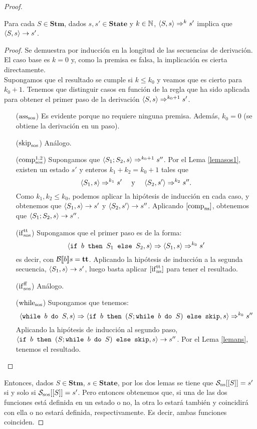 \begin{proof}
\begin{lema}
Para cada $S \in \mathbf{Stm}$, dados $s, s' \in \mathbf{State}$ y $k \in \mathbb{N}$, $\langle S, s \rangle\Rightarrow^k s'$ implica que $\langle S, s \rangle\to s'$.
\end{lema}
\begin{proof}
Se demuestra por inducción en la longitud de las secuencias de derivación. El caso base es $k=0$ y, como la premisa es falsa, la implicación es cierta directamente.
\\

Supongamos que el resultado se cumple si $k \leq k_0$ y veamos que es cierto para $k_0 +1$. Tenemos que distinguir casos en función de la regla que ha sido aplicada para obtener el primer paso de la derivación $\langle S, s \rangle\Rightarrow^{k_0+1}s'$.
\begin{itemize}
    \item[($\mathrm{ass}_{\mathrm{sos}}$)] Es evidente porque no requiere ninguna premisa. Además, $k_0 = 0$ (se obtiene la derivación en un paso).
    \item[($\mathrm{skip}_{\mathrm{sos}}$)] Análogo.
    \item[($\mathrm{comp}_{\mathrm{sos}}^{1, 2}$)] Supongamos que $\langle S_1;S_2, s \rangle\Rightarrow^{k_0+1}s''$. Por el Lema \ref{lemasos1}, existen un estado $s'$ y enteros $k_1 + k_2 = k_0 + 1$ tales que 
    $$\langle S_1, s \rangle\Rightarrow^{k_1}s' \quad \text{ y } \quad \langle S_2, s' \rangle\Rightarrow^{k_2}s''.$$
    Como $k_1, k_2 \leq k_0$, podemos aplicar la hipótesis de inducción en cada caso, y obtenemos que $\langle S_1, s \rangle\to s'$ y $\langle S_2, s' \rangle\to s''$. Aplicando $[\mathrm{comp}_{\mathrm{ns}}]$, obtenemos que $\langle S_1;S_2, s \rangle\to s''$.
    \item[($\mathrm{if}_{\mathrm{sos}}^{\mathrm{tt}}$)] Supongamos que el primer paso es de la forma:
    $$\langle \texttt{if }b\texttt{ then }S_1\texttt{ else }S_2, s \rangle\Rightarrow \langle S_1, s \rangle \Rightarrow^{k_0} s'$$
    es decir, con $\mathcal{B}[\![b]\!]s = \mathbf{tt}$. Aplicando la hipótesis de inducción a la segunda secuencia, $\langle S_1, s \rangle \to s'$, luego basta aplicar $[\mathrm{if}_{\mathrm{ns}}^{\mathrm{tt}}]$ para tener el resultado.
    \item[($\mathrm{if}_{\mathrm{sos}}^{\mathrm{ff}}$)] Análogo.
    \item[($\mathrm{while}_{\mathrm{sos}}$)] Supongamos que tenemos:
    $$\langle \texttt{while }b \texttt{ do }S, s \rangle\Rightarrow \langle \texttt{if }b \texttt{ then }(S; \texttt{while }b\texttt{ do }S)\texttt{ else skip}, s \rangle \Rightarrow^{k_0}s''$$
    Aplicando la hipótesis de inducción al segundo paso, $\langle \texttt{if }b \texttt{ then }(S; \texttt{while }b\texttt{ do }S)\texttt{ else skip}, s \rangle \to s''$. Por el Lema \ref{lemans}, tenemos el resultado.
\end{itemize}
\end{proof}

Entonces, dados $S \in \mathbf{Stm}$, $s\in \mathbf{State}$, por los dos lemas se tiene que $\mathcal{S}_{\mathrm{ns}}[[S]] = s'$ si y solo si $\mathcal{S}_{\mathrm{sos}}[[S]] = s'$. Pero entonces obtenemos que, si una de las dos funciones está definida en un estado o no, la otra lo estará también y coincidirá con ella o no estará definida, respectivamente. Es decir, ambas funciones coinciden.
\end{proof}



